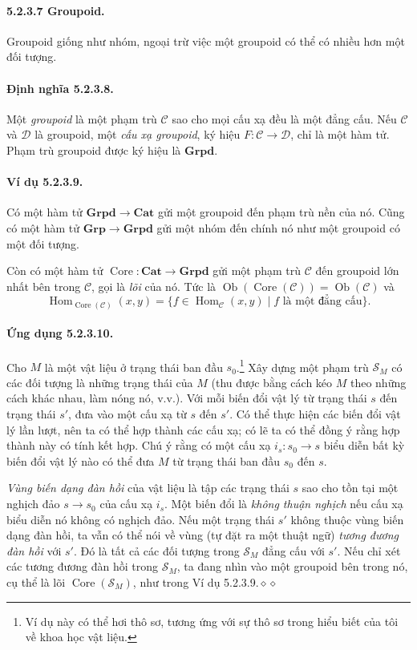 \paragraph{5.2.3.7 Groupoid.} Groupoid giống như nhóm, ngoại trừ việc một groupoid có thể có nhiều hơn một đối tượng.
\paragraph{Định nghĩa 5.2.3.8.} Một \emph{groupoid} là một phạm trù $\mathcal C$ sao cho mọi cấu xạ đều là một đẳng cấu. Nếu $\mathcal C$ và $\mathcal D$ là groupoid, một \emph{cấu xạ groupoid}, ký hiệu $F:\mathcal C\to\mathcal D$, chỉ là một hàm tử. Phạm trù groupoid được ký hiệu là $\mathbf{Grpd}$.
\paragraph{Ví dụ 5.2.3.9.} Có một hàm tử $\mathbf{Grpd}\to\mathbf{Cat}$ gửi một groupoid đến phạm trù nền của nó. Cũng có một hàm tử $\mathbf{Grp}\to\mathbf{Grpd}$ gửi một nhóm đến chính nó như một groupoid có một đối tượng.

Còn có một hàm tử $\operatorname{Core}:\mathbf{Cat}\to\mathbf{Grpd}$ gửi một phạm trù $\mathcal C$ đến groupoid lớn nhất bên trong $\mathcal C$, gọi là \emph{lõi} của nó. Tức là $\operatorname{Ob}(\operatorname{Core}(\mathcal C))=\operatorname{Ob}(\mathcal C)$ và
\[\operatorname{Hom}_{\operatorname{Core}(\mathcal C)}(x,y)=\{f\in\operatorname{Hom}_{\mathcal C}(x,y)\mid f\text{ là một đẳng cấu}\}.\]
\paragraph{Ứng dụng 5.2.3.10.} Cho $M$ là một vật liệu ở trạng thái ban đầu $s_0$.\footnote{Ví dụ này có thể hơi thô sơ, tương ứng với sự thô sơ trong hiểu biết của tôi về khoa học vật liệu.} Xây dựng một phạm trù $\mathcal S_M$ có các đối tượng là những trạng thái của $M$ (thu được bằng cách kéo $M$ theo những cách khác nhau, làm nóng nó, v.v.). Với mỗi biến đổi vật lý từ trạng thái $s$ đến trạng thái $s'$, đưa vào một cấu xạ từ $s$ đến $s'$. Có thể thực hiện các biến đổi vật lý lần lượt, nên ta có thể hợp thành các cấu xạ; có lẽ ta có thể đồng ý rằng hợp thành này có tính kết hợp. Chú ý rằng có một cấu xạ $i_s:s_0\to s$ biểu diễn bất kỳ biến đổi vật lý nào có thể đưa $M$ từ trạng thái ban đầu $s_0$ đến $s$.

\emph{Vùng biến dạng đàn hồi} của vật liệu là tập các trạng thái $s$ sao cho tồn tại một nghịch đảo $s\to s_0$ của cấu xạ $i_s$. Một biến đổi là \emph{không thuận nghịch} nếu cấu xạ biểu diễn nó không có nghịch đảo. Nếu một trạng thái $s'$ không thuộc vùng biến dạng đàn hồi, ta vẫn có thể nói về vùng (tự đặt ra một thuật ngữ) \emph{tương đương đàn hồi} với $s'$. Đó là tất cả các đối tượng trong $\mathcal S_M$ đẳng cấu với $s'$. Nếu chỉ xét các tương đương đàn hồi trong $\mathcal S_M$, ta đang nhìn vào một groupoid bên trong nó, cụ thể là lõi $\operatorname{Core}(\mathcal S_M)$, như trong Ví dụ 5.2.3.9.\hfill$\diamond\diamond$

